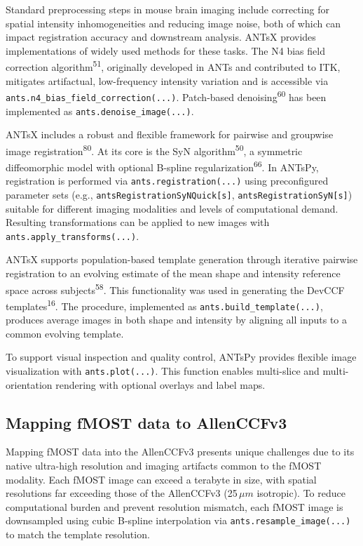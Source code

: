 \documentclass[
  12pt,
]{article}
\begin{document}
Standard preprocessing steps in mouse brain imaging include correcting
for spatial intensity inhomogeneities and reducing image noise, both of
which can impact registration accuracy and downstream analysis. ANTsX
provides implementations of widely used methods for these tasks. The N4
bias field correction algorithm\textsuperscript{51}, originally
developed in ANTs and contributed to ITK, mitigates artifactual,
low-frequency intensity variation and is accessible via
\texttt{ants.n4\_bias\_field\_correction(...)}. Patch-based
denoising\textsuperscript{60} has been implemented as
\texttt{ants.denoise\_image(...)}.

ANTsX includes a robust and flexible framework for pairwise and
groupwise image registration\textsuperscript{80}. At its core is the SyN
algorithm\textsuperscript{50}, a symmetric diffeomorphic model with
optional B-spline regularization\textsuperscript{66}. In ANTsPy,
registration is performed via \texttt{ants.registration(...)} using
preconfigured parameter sets (e.g.,
\texttt{antsRegistrationSyNQuick{[}s{]}},
\texttt{antsRegistrationSyN{[}s{]}}) suitable for different imaging
modalities and levels of computational demand. Resulting transformations
can be applied to new images with \texttt{ants.apply\_transforms(...)}.

ANTsX supports population-based template generation through iterative
pairwise registration to an evolving estimate of the mean shape and
intensity reference space across subjects\textsuperscript{58}. This
functionality was used in generating the DevCCF
templates\textsuperscript{16}. The procedure, implemented as
\texttt{ants.build\_template(...)}, produces average images in both
shape and intensity by aligning all inputs to a common evolving
template.

To support visual inspection and quality control, ANTsPy provides
flexible image visualization with \texttt{ants.plot(...)}. This function
enables multi-slice and multi-orientation rendering with optional
overlays and label maps.

\subsection{Mapping fMOST data to
AllenCCFv3}\label{mapping-fmost-data-to-allenccfv3}

Mapping fMOST data into the AllenCCFv3 presents unique challenges due to
its native ultra-high resolution and imaging artifacts common to the
fMOST modality. Each fMOST image can exceed a terabyte in size, with
spatial resolutions far exceeding those of the AllenCCFv3 (25\,\(\mu m\)
isotropic). To reduce computational burden and prevent resolution
mismatch, each fMOST image is downsampled using cubic B-spline
interpolation via \texttt{ants.resample\_image(...)} to match the
template resolution.
\end{document}
